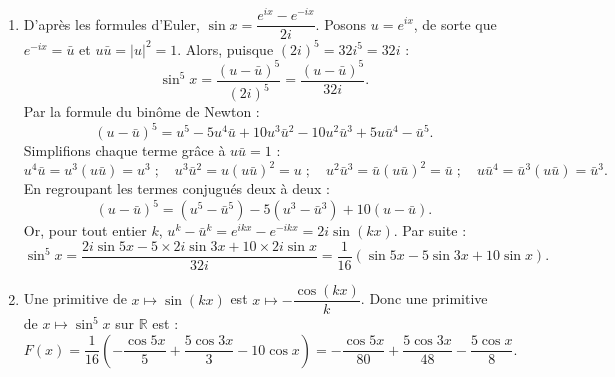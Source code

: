 \documentclass[11pt]{article}
\begin{document}
\begin{corrige}
\begin{enumerate}
\item D'après les formules d'Euler, $\sin x = \dfrac{e^{ix} - e^{-ix}}{2i}$. Posons $u = e^{ix}$, de sorte que $e^{-ix} = \bar{u}$ et $u\bar{u} = |u|^2 = 1$. Alors, puisque $(2i)^5 = 32i^5 = 32i$ :
\[ \sin^5 x = \frac{(u - \bar{u})^5}{(2i)^5} = \frac{(u - \bar{u})^5}{32i}. \]
Par la formule du binôme de Newton :
\[ (u - \bar{u})^5 = u^5 - 5u^4\bar{u} + 10u^3\bar{u}^2 - 10u^2\bar{u}^3 + 5u\bar{u}^4 - \bar{u}^5. \]
Simplifions chaque terme grâce à $u\bar{u} = 1$ :
\[ u^4\bar{u} = u^3(u\bar{u}) = u^3 \;; \quad u^3\bar{u}^2 = u(u\bar{u})^2 = u \;; \quad u^2\bar{u}^3 = \bar{u}(u\bar{u})^2 = \bar{u} \;; \quad u\bar{u}^4 = \bar{u}^3(u\bar{u}) = \bar{u}^3. \]
En regroupant les termes conjugués deux à deux :
\[ (u - \bar{u})^5 = \left(u^5 - \bar{u}^5\right) - 5\left(u^3 - \bar{u}^3\right) + 10\left(u - \bar{u}\right). \]
Or, pour tout entier $k$, $u^k - \bar{u}^k = e^{ikx} - e^{-ikx} = 2i\sin(kx)$. Par suite :
\[ \sin^5 x = \frac{2i\sin 5x - 5 \times 2i\sin 3x + 10 \times 2i\sin x}{32i} = \frac{1}{16}\left(\sin 5x - 5\sin 3x + 10\sin x\right). \]
\item Une primitive de $x \mapsto \sin(kx)$ est $x \mapsto -\dfrac{\cos(kx)}{k}$. Donc une primitive de $x \mapsto \sin^5 x$ sur $\mathbb{R}$ est :
\[ F(x) = \frac{1}{16}\left(-\frac{\cos 5x}{5} + \frac{5\cos 3x}{3} - 10\cos x\right) = -\frac{\cos 5x}{80} + \frac{5\cos 3x}{48} - \frac{5\cos x}{8}. \]
\end{enumerate}
\end{corrige}
\end{document}
